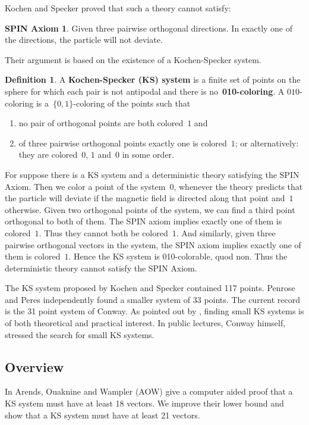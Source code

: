 \documentclass[a4paper]{article}
\newcommand{\keyword}[1]{\textbf{#1}}
\newcounter{main}
\theoremstyle{definition}
\newtheorem{dfn}[main]{Definition}
\newtheorem*{spin}{SPIN Axiom \cite{ck09}}
\theoremstyle{remark}
\begin{document}
Kochen and Specker proved that such a theory cannot satisfy:
\begin{spin}
    Given three pairwise orthogonal directions.
    In exactly one of the directions, the particle will not deviate.
\end{spin}
Their argument is based on the existence of a Kochen-Specker system.
\begin{dfn}
    A \keyword{Kochen-Specker (KS) system} is
    a finite set of points on the sphere
    for which each pair is not antipodal and
    there is no~\keyword{010-coloring}.
    A $010$-coloring is a~$\{0,1\}$-coloring of the points such that
    \begin{enumerate}
        \item
            no pair of orthogonal points are both colored~$1$ and
        \item
            of three pairwise orthogonal points exactly one is colored~$1$;
            or alternatively: they are colored~$0$, $1$ and~$0$ in some order.
    \end{enumerate}
\end{dfn}
For suppose there is a KS system and  a deterministic theory satisfying
the SPIN Axiom.
Then we color a point of the system~$0$,
whenever the theory predicts that the particle will deviate
if the magnetic field is directed along that point and~$1$ otherwise.
Given two orthogonal points of the system,
we can find a third point orthogonal to both of them.
The SPIN axiom implies exactly one of them is colored~$1$.
Thus they cannot both be colored~$1$.
And similarly, given three pairwise orthogonal vectors in the system,
the SPIN axiom implies exactly one of them is colored~$1$.
Hence the KS system is 010-colorable, quod non.  Thus the deterministic theory
cannot satisfy the SPIN Axiom.

The KS system proposed by Kochen and Specker contained 117 points\cite{ks}.
Penrose and Peres independently found a smaller system of 33 points.
The current record is the 31 point system of Conway.
As pointed out by \cite{c00,aow11}, finding small KS systems
is of both theoretical and practical interest.
In public lectures, Conway himself, stressed the search for small KS systems.

\subsection{Overview}
In \cite{aow11} Arends, Ouaknine and Wampler (AOW) give a computer aided proof
that a KS system must have at least 18 vectors.  We improve their lower bound
and show that a KS system must have at least 21 vectors.
\end{document}
